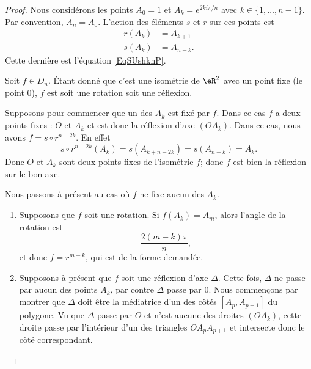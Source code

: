 \begin{proof}
    Nous considérons les points \( A_0=1\) et \( A_k= e^{2ki\pi/n}\) avec \( k\in\{ 1,\ldots, n-1 \}\). Par convention, \( A_n=A_0\). L'action des éléments \( s\) et \( r\) sur ces points est
    \begin{subequations}
        \begin{align}
            r(A_k)&=A_{k+1}\\
            s(A_k)&=A_{n-k}.
        \end{align}
    \end{subequations}
    Cette dernière est l'équation \eqref{EqSUshknP}.
    
    Soit \( f\in D_n\). Étant donné que c'est une isométrie de \( \eR^2\) avec un point fixe (le point \( 0\)), \( f\) est soit une rotation soit une réflexion.

    Supposons pour commencer que un des \( A_k\) est fixé par \( f\). Dans ce cas \( f\) a deux points fixes : \( O\) et \( A_k\) et est donc la réflexion d'axe \( (OA_k)\). Dans ce cas, nous avons \( f=s\circ r^{n-2k}\). En effet
    \begin{equation}
        s\circ r^{n-2k}(A_k)=s(A_{k+n-2k})=s(A_{n-k})=A_k.
    \end{equation}
    Donc \( O\) et \( A_k\) sont deux points fixes de l'isométrie \( f\); donc \( f\) est bien la réflexion sur le bon axe.

    Nous passons à présent au cas où \( f\) ne fixe aucun des \( A_k\). 
    \begin{enumerate}
        \item
            Supposons que \( f\) soit une rotation. Si \( f(A_k)=A_m\), alors l'angle de la rotation est 
            \begin{equation}
                \frac{ 2(m-k)\pi }{ n },
            \end{equation}
            et donc \( f=r^{m-k}\), qui est de la forme demandée.
        \item
            Supposons à présent que \( f\) soit une réflexion d'axe \( \Delta\). Cette fois, \( \Delta\) ne passe par aucun des points \( A_k\), par contre \( \Delta\) passe par \( 0\). Nous commençons par montrer que \( \Delta\) doit être la médiatrice d'un des côtés \( [A_p,A_{p+1}]\) du polygone. Vu que \( \Delta\) passe par \( O\) et n'est aucune des droites \( (OA_k)\), cette droite passe par l'intérieur d'un des triangles \( OA_pA_{p+1}\) et intersecte donc le côté correspondant.


\end{enumerate}
\end{proof}

